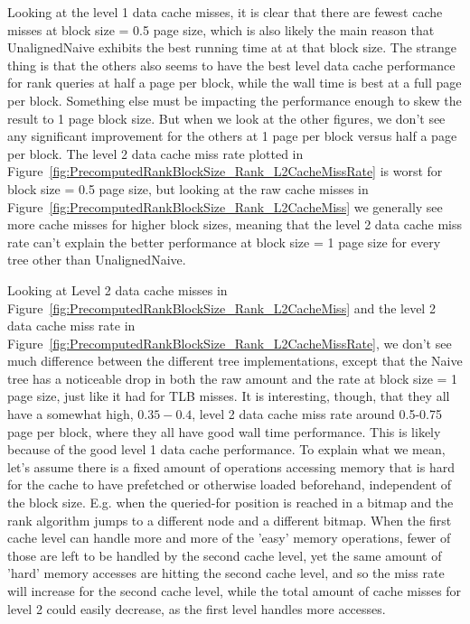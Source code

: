 Looking at the level 1 data cache misses, it is clear that there are fewest cache misses at block size = 0.5 page size, which is also likely the main reason that UnalignedNaive exhibits the best running time at at that block size.
The strange thing is that the others also seems to have the best level data cache performance for rank queries at half a page per block, while the wall time is best at a full page per block.
Something else must be impacting the performance enough to skew the result to 1 page block size.
But when we look at the other figures, we don't see any significant improvement for the others at 1 page per block versus half a page per block.
The level 2 data cache miss rate plotted in Figure~\ref{fig:PrecomputedRankBlockSize_Rank_L2CacheMissRate} is worst for block size = 0.5 page size, but looking at the raw cache misses in Figure~\ref{fig:PrecomputedRankBlockSize_Rank_L2CacheMiss} we generally see more cache misses for higher block sizes, meaning that the level 2 data cache miss rate can't explain the better performance at block size = 1 page size for every tree other than UnalignedNaive.

Looking at Level 2 data cache misses in Figure~\ref{fig:PrecomputedRankBlockSize_Rank_L2CacheMiss} and the level 2 data cache miss rate in Figure~\ref{fig:PrecomputedRankBlockSize_Rank_L2CacheMissRate}, we don't see much difference between the different tree implementations, except that the Naive tree has a noticeable drop in both the raw amount and the rate at block size = 1 page size, just like it had for TLB misses.
It is interesting, though, that they all have a somewhat high, $0.35-0.4$, level 2 data cache miss rate around 0.5-0.75 page per block, where they all have good wall time performance.
This is likely because of the good level 1 data cache performance.
To explain what we mean, let's assume there is a fixed amount of operations accessing memory that is hard for the cache to have prefetched or otherwise loaded beforehand, independent of the block size.
E.g. when the queried-for position is reached in a bitmap and the rank algorithm jumps to a different node and a different bitmap.
When the first cache level can handle more and more of the 'easy' memory operations, fewer of those are left to be handled by the second cache level, yet the same amount of 'hard' memory accesses are hitting the second cache level, and so the miss rate will increase for the second cache level, while the total amount of cache misses for level 2 could easily decrease, as the first level handles more accesses.


